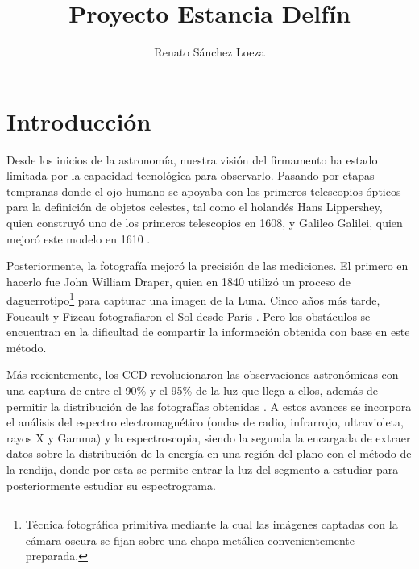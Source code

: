 \documentclass[9pt,twocolumn,a4paper]{opticajnl}
\title{Proyecto Estancia Delfín}
\author{Renato Sánchez Loeza}
\begin{document}
\maketitle
\section*{Introducción}
Desde los inicios de la astronomía, nuestra visión del firmamento ha estado limitada por la capacidad tecnológica para observarlo. Pasando por etapas tempranas donde el ojo humano se apoyaba con los primeros telescopios ópticos para la definición de objetos celestes, tal como el holandés Hans Lippershey, quien construyó uno de los primeros telescopios en 1608, y Galileo Galilei, quien mejoró este modelo en 1610 \cite{cana-2015}.

Posteriormente, la fotografía mejoró la precisión de las mediciones. El primero en hacerlo fue John William Draper, quien en 1840 utilizó un proceso de daguerrotipo\footnote{Técnica fotográfica primitiva mediante la cual las imágenes captadas con la cámara oscura se fijan sobre una chapa metálica convenientemente preparada.} para capturar una imagen de la Luna. Cinco años más tarde, Foucault y Fizeau fotografiaron el Sol desde París \cite{olsen2021birth}. Pero los obstáculos se encuentran en la dificultad de compartir la información obtenida con base en este método.

Más recientemente, los CCD revolucionaron las observaciones astronómicas con una captura de entre el 90\% y el 95\% de la luz que llega a ellos, además de permitir la distribución de las fotografías obtenidas \cite{las-cumbres}. A estos avances se incorpora el análisis del espectro electromagnético (ondas de radio, infrarrojo, ultravioleta, rayos X y Gamma) y la espectroscopia, siendo la segunda la encargada de extraer datos sobre la distribución de la energía en una región del plano con el método de la rendija, donde por esta se permite entrar la luz del segmento a estudiar para posteriormente estudiar su espectrograma.
\end{document}
